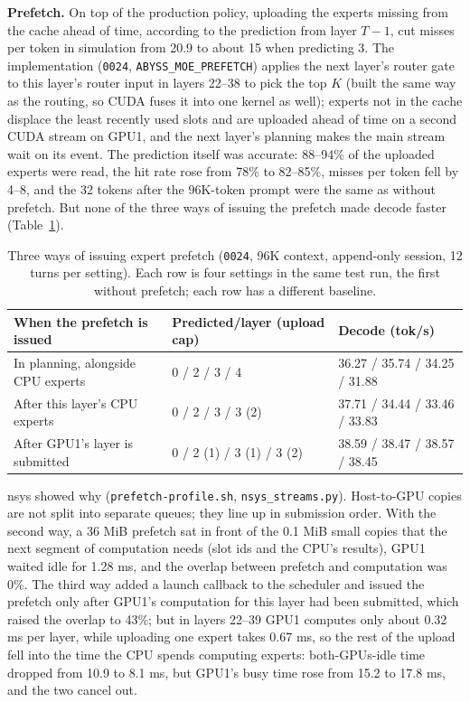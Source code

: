 \documentclass[11pt,a4paper]{article}
\newcommand{\code}[1]{\texttt{#1}}
\newcommand{\tps}{tok/s}
\begin{document}
\textbf{Prefetch.} On top of the production policy, uploading the experts missing from the cache ahead of time, according to the prediction from layer $T-1$, cut misses per token in simulation from 20.9 to about 15 when predicting 3. The implementation (\code{0024}, \code{ABYSS\_MOE\_PREFETCH}) applies the next layer's router gate to this layer's router input in layers 22--38 to pick the top $K$ (built the same way as the routing, so CUDA fuses it into one kernel as well); experts not in the cache displace the least recently used slots and are uploaded ahead of time on a second CUDA stream on GPU1, and the next layer's planning makes the main stream wait on its event. The prediction itself was accurate: 88--94\% of the uploaded experts were read, the hit rate rose from 78\% to 82--85\%, misses per token fell by 4--8, and the 32 tokens after the 96K-token prompt were the same as without prefetch. But none of the three ways of issuing the prefetch made decode faster (Table~\ref{tab:prefetch}).

\begin{table}[h]
  \centering
  \small
  \caption{Three ways of issuing expert prefetch (\code{0024}, 96K context, append-only session, 12 turns per setting). Each row is four settings in the same test run, the first without prefetch; each row has a different baseline.}
  \label{tab:prefetch}
  \begin{tabular}{@{}l l l@{}}
    \toprule
    When the prefetch is issued & Predicted/layer (upload cap) & Decode (\tps) \\
    \midrule
    In planning, alongside CPU experts & 0 / 2 / 3 / 4 & 36.27 / 35.74 / 34.25 / 31.88 \\
    After this layer's CPU experts & 0 / 2 / 3 / 3 (2) & 37.71 / 34.44 / 33.46 / 33.83 \\
    After GPU1's layer is submitted & 0 / 2 (1) / 3 (1) / 3 (2) & 38.59 / 38.47 / 38.57 / 38.45 \\
    \bottomrule
  \end{tabular}
\end{table}

nsys showed why (\code{prefetch-profile.sh}, \code{nsys\_streams.py}). Host-to-GPU copies are not split into separate queues; they line up in submission order. With the second way, a 36 MiB prefetch sat in front of the 0.1 MiB small copies that the next segment of computation needs (slot ids and the CPU's results), GPU1 waited idle for 1.28 ms, and the overlap between prefetch and computation was 0\%. The third way added a launch callback to the scheduler and issued the prefetch only after GPU1's computation for this layer had been submitted, which raised the overlap to 43\%; but in layers 22--39 GPU1 computes only about 0.32 ms per layer, while uploading one expert takes 0.67 ms, so the rest of the upload fell into the time the CPU spends computing experts: both-GPUs-idle time dropped from 10.9 to 8.1 ms, but GPU1's busy time rose from 15.2 to 17.8 ms, and the two cancel out.
\end{document}
